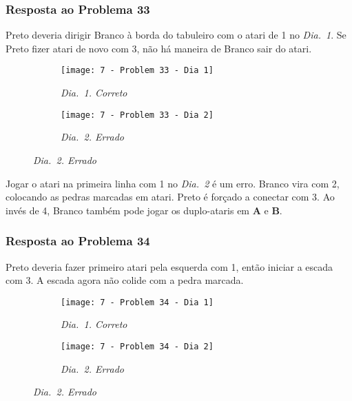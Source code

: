 \pagebreak

\subsubsection*{Resposta ao Problema 33}

Preto deveria dirigir Branco à borda do tabuleiro com o atari de 1 no \emph{Dia.\@~1}. Se Preto fizer atari de novo com 3, não há maneira de Branco sair do atari.

\begin{figure}[h!]
    \centering
    \begin{subfigure}[t]{.425\textwidth}
        \texttt{[image: 7 - Problem 33 - Dia 1]}
        \captionsetup{justification=centering}
        \caption*{\emph{Dia.\@~1. Correto}}
    \end{subfigure}
    \hspace{1cm}
    \begin{subfigure}[t]{.425\textwidth}
        \texttt{[image: 7 - Problem 33 - Dia 2]}
        \captionsetup{justification=centering}
        \caption*{\emph{Dia.\@~2. Errado}}
    \end{subfigure}
\end{figure}

Jogar o atari na primeira linha com 1 no \emph{Dia.\@~2} é um erro. Branco vira com 2, colocando as pedras marcadas em atari. Preto é forçado a conectar com 3. Ao invés de 4, Branco também pode jogar os duplo-ataris em \textbf{A} e \textbf{B}.

\pagebreak

\subsubsection*{Resposta ao Problema 34}

Preto deveria fazer primeiro atari pela esquerda com 1, então iniciar a escada com 3. A escada agora não colide com a pedra marcada.
        
\begin{figure}[h!]
    \centering
    \begin{subfigure}[t]{.425\textwidth}
        \texttt{[image: 7 - Problem 34 - Dia 1]}
        \captionsetup{justification=centering}
        \caption*{\emph{Dia.\@~1. Correto}}
    \end{subfigure}
    \hspace{1cm}
    \begin{subfigure}[t]{.425\textwidth}
        \texttt{[image: 7 - Problem 34 - Dia 2]}
        \captionsetup{justification=centering}
        \caption*{\emph{Dia.\@~2. Errado}}
    \end{subfigure}
\end{figure}

